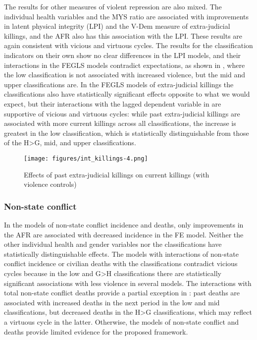 \documentclass[12pt]{article}
\begin{document}
The results for other measures of violent repression are also mixed.
The individual health variables and the MYS ratio are associated with improvements in latent physical integrity (LPI) and the V-Dem measure of extra-judicial killings, and the AFR also has this association with the LPI. These results are again consistent with vicious and virtuous cycles.
The results for the classification indicators on their own show no clear differences in the LPI models, and their interactions in the FEGLS models contradict expectations, as shown in , where the low classification is not associated with increased violence, but the mid and upper classifications are.
In the FEGLS models of extra-judicial killings the classifications also have statistically significant effects opposite to what we would expect, but their interactions with the lagged dependent variable in  are supportive of vicious and virtuous cycles: while past extra-judicial killings are associated with more current killings across all classifications, the increase is greatest in the low classification, which is statistically distinguishable from those of the H>G, mid, and upper classifications.

\begin{figure}[!htb]
    \centering
    \caption{Effects of past extra-judicial killings on current killings (with violence controls)}
    \label{int_killings_class}
    \texttt{[image: figures/int\_killings-4.png]}
\end{figure}

\subsubsection{Non-state conflict}

In the models of non-state conflict incidence and deaths, only improvements in the AFR are associated with decreased incidence in the FE model. Neither the other individual health and gender variables nor the classifications have statistically distinguishable effects. The models with interactions of non-state conflict incidence or civilian deaths with the classifications contradict vicious cycles because in the low and G>H classifications there are statistically significant associations with less violence in several models.
The interactions with total non-state conflict deaths provide a partial exception in : past deaths are associated with increased deaths in the next period in the low and mid classifications, but decreased deaths in the H>G classifications, which may reflect a virtuous cycle in the latter.
Otherwise, the models of non-state conflict and deaths provide limited evidence for the proposed framework.
\end{document}
